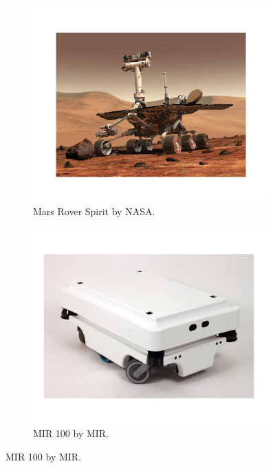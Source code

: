 \begin{figure}[htb]
	\centering
    \begin{subfigure}[t]{0.31\textwidth}
        \includegraphics[width=\textwidth]{figures/mobile_rover}
        \caption{Mars Rover Spirit by NASA.}
        \label{fig:mobile_rover}
    \end{subfigure}
    \centering
    \begin{subfigure}[t]{0.31\textwidth}
        \includegraphics[width=\textwidth]{figures/mobile_mir}
        \caption{MIR 100 by MIR.}
        \label{fig:mobile_mir}

\end{subfigure}
\end{figure}

